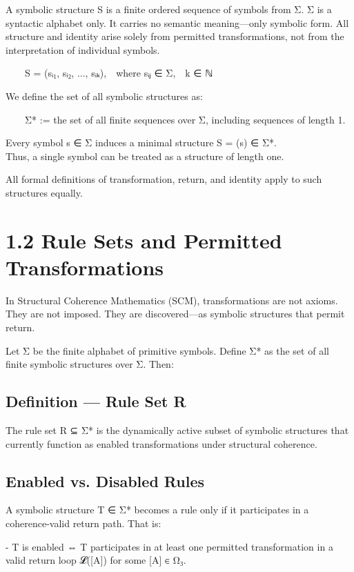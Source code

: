 A symbolic structure S is a finite ordered sequence of symbols from Σ. Σ
is a syntactic alphabet only. It carries no semantic meaning---only
symbolic form. All structure and identity arise solely from permitted
transformations, not from the interpretation of individual symbols.

  S = (sᵢ₁, sᵢ₂, ..., sᵢₖ), where sᵢⱼ ∈ Σ, k ∈ ℕ

We define the set of all symbolic structures as:

  Σ* := the set of all finite sequences over Σ, including sequences of
length 1.

Every symbol s ∈ Σ induces a minimal structure S = (s) ∈ Σ*.\\
Thus, a single symbol can be treated as a structure of length one.

All formal definitions of transformation, return, and identity apply to
such structures equally.

\section{1.2 \textbar{} Rule Sets and Permitted
Transformations}\label{rule-sets-and-permitted-transformations}

In Structural Coherence Mathematics (SCM), transformations are not
axioms. They are not imposed. They are discovered---as symbolic
structures that permit return.

Let Σ be the finite alphabet of primitive symbols. Define Σ* as the set
of all finite symbolic structures over Σ. Then:

\subsection{Definition --- Rule Set R}\label{definition-rule-set-r}

The rule set R ⊆ Σ* is the dynamically active subset of symbolic
structures that currently function as enabled transformations under
structural coherence.

\subsection{Enabled vs. Disabled
Rules}\label{enabled-vs.-disabled-rules}

A symbolic structure T ∈ Σ* becomes a rule only if it participates in a
coherence-valid return path. That is:

- T is enabled ⇔ T participates in at least one permitted transformation
in a valid return loop 𝓛({[}A{]}) for some {[}A{]} ∈ Ω₃.

